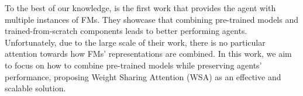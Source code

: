To the best of our knowledge, \citet{sima2024} is the first work that provides the agent with multiple instances of FMs.
They showcase that combining pre-trained models and trained-from-scratch components leads to better performing agents.
Unfortunately, due to the large scale of their work, there is no particular attention towards how FMs' representations are combined.
In this work, we aim to focus on how to combine pre-trained models while preserving agents' performance, proposing Weight Sharing Attention (WSA) as an effective and scalable solution.




%
%
%
%
%
%
%
%
%
%
%
%
%
%
%
%
%
%
%
%
%

